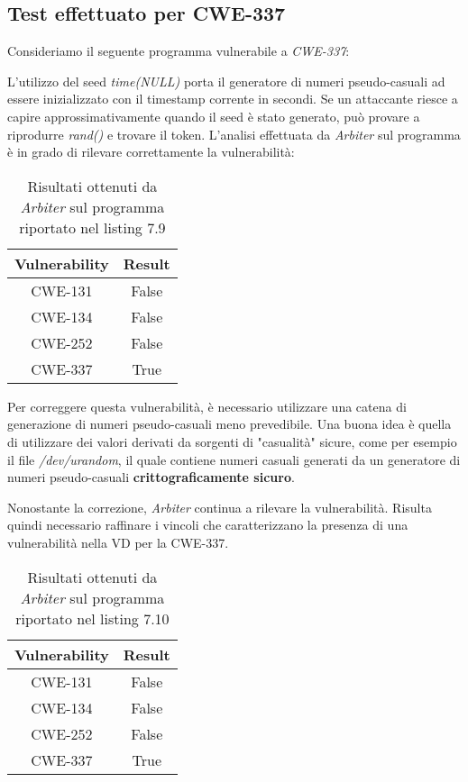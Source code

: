 \documentclass[../main.tex]{subfiles}
\begin{document}
\subsection{Test effettuato per CWE-337}
Consideriamo il seguente programma vulnerabile a \textit{CWE-337}:

L'utilizzo del seed \textit{time(NULL)} porta il generatore di numeri pseudo-casuali ad essere inizializzato con il timestamp
corrente in secondi. Se un attaccante riesce a capire approssimativamente quando il seed è stato generato, può provare
a riprodurre \textit{rand()} e trovare il token. L'analisi effettuata da \textit{Arbiter} sul programma è in grado di rilevare correttamente la vulnerabilità:
\begin{table}[H]
    \centering
    \begin{tabular}{|c|c|}
    \hline
    Vulnerability & Result \\ \hline
    CWE-131       & False   \\ \hline
    CWE-134       & False  \\ \hline
    CWE-252       & False  \\ \hline
    CWE-337       & True  \\ \hline
    \end{tabular}
    \caption{Risultati ottenuti da \textit{Arbiter} sul programma riportato nel listing 7.9}
\end{table} \noindent
Per correggere questa vulnerabilità, è necessario utilizzare una catena di generazione di numeri pseudo-casuali meno prevedibile. 
Una buona idea è quella di utilizzare dei valori derivati da sorgenti di "casualità" sicure, come per esempio
il file \textit{/dev/urandom}, il quale contiene numeri casuali generati da un generatore di numeri pseudo-casuali
\textbf{crittograficamente sicuro}.

Nonostante la correzione, \textit{Arbiter} continua a rilevare la vulnerabilità. Risulta quindi necessario raffinare i vincoli che caratterizzano
la presenza di una vulnerabilità nella VD per la CWE-337.
\begin{table}[H]
    \centering
    \begin{tabular}{|c|c|}
    \hline
    Vulnerability & Result \\ \hline
    CWE-131       & False   \\ \hline
    CWE-134       & False  \\ \hline
    CWE-252       & False  \\ \hline
    CWE-337       & True  \\ \hline
    \end{tabular}
    \caption{Risultati ottenuti da \textit{Arbiter} sul programma riportato nel listing 7.10}
\end{table}
\end{document}
